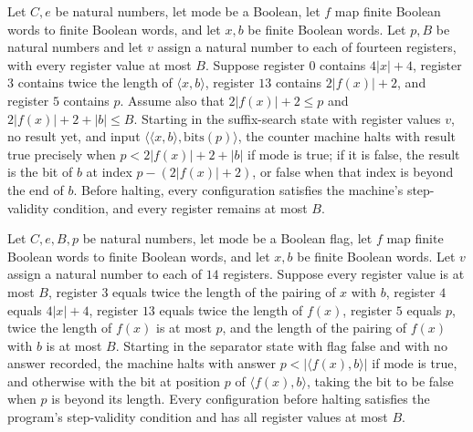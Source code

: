 \begin{lemma}
\label{Complexity.comp_suffix_run}
\leanok
{}
Let $C,e$ be natural numbers, let $\mathrm{mode}$ be a Boolean, let $f$ map finite
Boolean words to finite Boolean words, and let $x,b$ be finite Boolean words. Let $p,B$
be natural numbers and let $v$ assign a natural number to each of fourteen registers,
with every register value at most $B$. Suppose register $0$ contains $4|x|+4$, register
$3$ contains twice the length of $\langle x,b\rangle$, register $13$ contains
$2|f(x)|+2$, and register $5$ contains $p$. Assume also that $2|f(x)|+2\le p$ and
$2|f(x)|+2+|b|\le B$. Starting in the suffix-search state with register values $v$, no
result yet, and input $\langle\langle x,b\rangle,\mathrm{bits}(p)\rangle$, the counter
machine halts with result true precisely when $p<2|f(x)|+2+|b|$ if $\mathrm{mode}$ is
true; if it is false, the result is the bit of $b$ at index $p-(2|f(x)|+2)$, or false
when that index is beyond the end of $b$. Before halting, every configuration satisfies
the machine's step-validity condition, and every register remains at most $B$.
\end{lemma}

\begin{lemma}
\label{Complexity.comp_separator_run}
\leanok
{}
Let $C,e,B,p$ be natural numbers, let $\text{mode}$ be a Boolean flag, let $f$ map finite
Boolean words to finite Boolean words, and let $x,b$ be finite Boolean words. Let $v$
assign a natural number to each of $14$ registers. Suppose every register value is at
most $B$, register $3$ equals twice the length of the pairing of $x$ with $b$, register
$4$ equals $4|x|+4$, register $13$ equals twice the length of $f(x)$, register $5$
equals $p$, twice the length of $f(x)$ is at most $p$, and the length of the pairing of
$f(x)$ with $b$ is at most $B$. Starting in the separator state with flag false and with
no answer recorded, the machine halts with answer $p<|\langle f(x),b\rangle|$ if
$\text{mode}$ is true, and otherwise with the bit at position $p$ of $\langle
f(x),b\rangle$, taking the bit to be false when $p$ is beyond its length. Every
configuration before halting satisfies the program's step-validity condition and has all
register values at most $B$.
\end{lemma}

